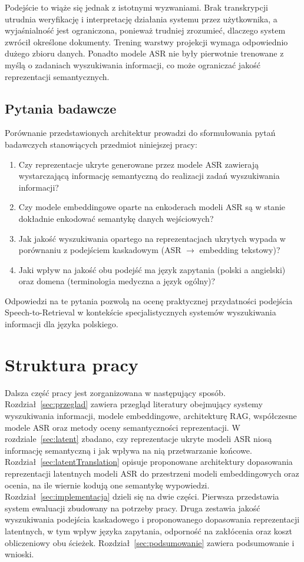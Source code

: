 Podejście to wiąże się jednak z istotnymi wyzwaniami. Brak transkrypcji utrudnia weryfikację i interpretację działania systemu przez użytkownika, a wyjaśnialność jest ograniczona, ponieważ trudniej zrozumieć, dlaczego system zwrócił określone dokumenty. Trening warstwy projekcji wymaga odpowiednio dużego zbioru danych. Ponadto modele ASR nie były pierwotnie trenowane z myślą o zadaniach wyszukiwania informacji, co może ograniczać jakość reprezentacji semantycznych.

\subsection{Pytania badawcze}
\label{sec:pytania}

Porównanie przedstawionych architektur prowadzi do sformułowania pytań badawczych stanowiących przedmiot niniejszej pracy:

\begin{enumerate}
    \item Czy reprezentacje ukryte generowane przez modele ASR zawierają wystarczającą informację semantyczną do realizacji zadań wyszukiwania informacji?
    \item Czy modele embeddingowe oparte na enkoderach modeli ASR są w stanie dokładnie enkodować semantykę danych wejściowych?
    \item Jak jakość wyszukiwania opartego na reprezentacjach ukrytych wypada w porównaniu z podejściem kaskadowym (ASR $\rightarrow$ embedding tekstowy)?
    \item Jaki wpływ na jakość obu podejść ma język zapytania (polski a angielski) oraz domena (terminologia medyczna a język ogólny)?
\end{enumerate}

Odpowiedzi na te pytania pozwolą na ocenę praktycznej przydatności podejścia Speech-to-Retrieval w kontekście specjalistycznych systemów wyszukiwania informacji dla języka polskiego.

\section{Struktura pracy}

Dalsza część pracy jest zorganizowana w następujący sposób. Rozdział~\ref{sec:przeglad} zawiera przegląd literatury obejmujący systemy wyszukiwania informacji, modele embeddingowe, architekturę RAG, współczesne modele ASR oraz metody oceny semantyczności reprezentacji.
W rozdziale~\ref{sec:latent} zbadano, czy reprezentacje ukryte modeli ASR niosą informację semantyczną i jak wpływa na nią przetwarzanie końcowe.
Rozdział~\ref{sec:latentTranslation} opisuje proponowane architektury dopasowania reprezentacji latentnych modeli ASR do przestrzeni modeli embeddingowych oraz ocenia, na ile wiernie kodują one semantykę wypowiedzi.
Rozdział~\ref{sec:implementacja} dzieli się na dwie części. Pierwsza przedstawia system ewaluacji zbudowany na potrzeby pracy. Druga zestawia jakość wyszukiwania podejścia kaskadowego i proponowanego dopasowania reprezentacji latentnych, w tym wpływ języka zapytania, odporność na zakłócenia oraz koszt obliczeniowy obu ścieżek.
Rozdział~\ref{sec:podsumowanie} zawiera podsumowanie i wnioski.

